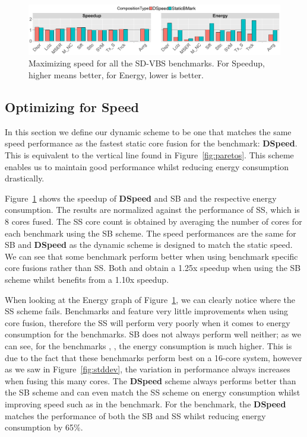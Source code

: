 \begin{figure}[t]
    \centering
	\includegraphics[width=1\textwidth]{graphics/results/speed_bars.pdf}
\vspace*{-2em}
    \caption{Maximizing speed for all the SD-VBS benchmarks. For Speedup, higher means better, for Energy, lower is better.}
    \label{fig:speedres}
\vspace{5mm}
\end{figure}
%

\subsection{Optimizing for Speed} \label{sec:dyn:speed}

In this section we define our dynamic scheme to be one that matches the same speed performance as the fastest static core fusion for the benchmark: \textbf{DSpeed}.
This is equivalent to the vertical line found in Figure~\ref{fig:paretos}.
This scheme enables us to maintain good performance whilst reducing energy consumption drastically.

Figure~\ref{fig:speedres} shows the speedup of \textbf{DSpeed} and SB and the respective energy consumption.
The results are normalized against the performance of SS, which is 8 cores fused.
The SS core count is obtained by averaging the number of cores for each benchmark using the SB scheme. 
The speed performances are the same for SB and \textbf{DSpeed} as the dynamic scheme is designed to match the static speed.
We can see that some benchmark perform better when using benchmark specific core fusions rather than SS.
Both  and  obtain a 1.25x speedup when using the SB scheme whilst  benefits from a 1.10x speedup.

When looking at the Energy graph of Figure~\ref{fig:speedres}, we can clearly notice where the SS scheme fails.
Benchmarks  and  feature very little improvements when using core fusion, therefore the SS will perform very poorly when it comes to energy consumption for the benchmarks.
SB does not always perform well neither; as we can see, for the benchmarks , ,  the energy consumption is much higher.
This is due to the fact that these benchmarks perform best on a 16-core system, however as we saw in Figure~\ref{fig:stddev}, the variation in performance always increases when fusing this many cores.
The \textbf{DSpeed} scheme always performs better than the SB scheme and can even match the SS scheme on energy consumption whilst improving speed such as in the  benchmark.
For the  benchmark, the \textbf{DSpeed} matches the performance of both the SB and SS whilst reducing energy consumption by 65\%.

